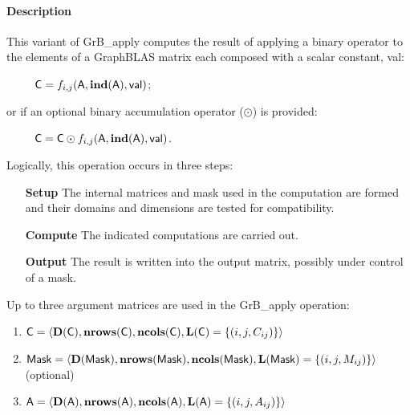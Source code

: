 \paragraph{Description}

This variant of {\sf GrB\_apply} computes the result of applying a binary operator
to the elements of a GraphBLAS matrix each composed with a scalar constant, {\sf val}:   
\begin{itemize}[leftmargin=2.1in]
\item[~] ${\sf C} = f_{i,j}({\sf A}, \bold{ind}({\sf A}), {\sf val})$;
\end{itemize}
or if an optional binary accumulation operator ($\odot$) is provided:  
\begin{itemize}[leftmargin=2.1in]
\item[~] ${\sf C} = {\sf C} \odot f_{i,j}({\sf A}, \bold{ind}({\sf A}), {\sf val})$.  
\end{itemize}

Logically, this operation occurs in three steps:
\begin{enumerate}[leftmargin=0.85in]
\item[\bf Setup] The internal matrices and mask used in the computation are formed 
and their domains and dimensions are tested for compatibility.
\item[\bf Compute] The indicated computations are carried out.
\item[\bf Output] The result is written into the output matrix, possibly under 
control of a mask.
\end{enumerate}

Up to three argument matrices are used in the {\sf GrB\_apply} operation:
\begin{enumerate}
	\item ${\sf C} = \langle \bold{D}({\sf C}),\bold{nrows}({\sf C}),
    \bold{ncols}({\sf C}),\bold{L}({\sf C}) = \{(i,j,C_{ij}) \} \rangle$

	\item ${\sf Mask} = \langle \bold{D}({\sf Mask}),\bold{nrows}({\sf Mask}),
    \bold{ncols}({\sf Mask}),\bold{L}({\sf Mask}) = \{(i,j,M_{ij}) \} \rangle$ (optional)

	\item ${\sf A} = \langle \bold{D}({\sf A}),\bold{nrows}({\sf A}),
    \bold{ncols}({\sf A}),\bold{L}({\sf A}) = \{(i,j,A_{ij}) \} \rangle$
\end{enumerate}

